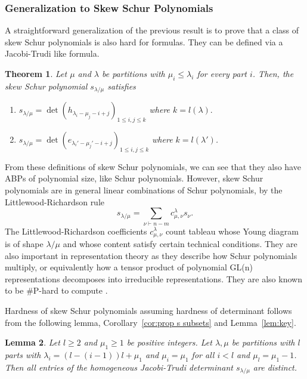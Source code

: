 \documentclass[10pt,a4paper]{article}
\newtheorem{theorem}{Theorem}
\newtheorem{lemma}[theorem]{Lemma}
\theoremstyle{definition}
\begin{document}
%
%
%
%
%

%

 


\subsubsection{Generalization to Skew Schur Polynomials}

A straightforward generalization of the previous result is to prove that a class of skew Schur polynomials is also hard for formulas. They can be defined via a Jacobi-Trudi like formula. 

\begin{theorem}\label{def: skew schur definition}
Let $\mu$ and $\lambda$ be partitions with $\mu_i \leq \lambda_i$ for every part $i$. Then, the skew Schur polynomial $s_{\lambda/\mu}$ satisfies

\begin{enumerate}
\item $s_{\lambda/\mu} = \det(h_{\lambda_i - \mu_j - i + j})_{1\leq i, j \leq k}$ where $k = l(\lambda).$
\item $s_{\lambda/\mu} = \det(e_{\lambda_i' - \mu_j' - i+j})_{1 \leq i, j \leq k}$ where $k = l(\lambda')$.  
\end{enumerate}
\end{theorem}

From these definitions of skew Schur polynomials, we can see that they also have ABPs of polynomial size, like Schur polynomials. However, skew Schur polynomials are in general linear combinations of Schur polynomials, by the Littlewood-Richardson rule $$s_{\lambda / \mu} = \sum_{\nu \vdash n - m} c^\lambda_{\mu, \nu} s_\nu.$$ The Littlewood-Richardson coefficients $c^\lambda_{\mu, \nu}$ count tableau whose Young diagram is of shape $\lambda / \mu$ and whose content satisfy certain technical conditions. They are also important in representation theory as they describe how Schur polynomials multiply, or equivalently how a tensor product of polynomial GL(n) representations decomposes into irreducible representations. They are also known to be \#P-hard to compute \cite{r29}. 

Hardness of skew Schur polynomials assuming hardness of determinant follows from the following lemma, Corollary~\ref{cor:prop s subsets} and Lemma~\ref{lem:key}.
%
%
%

%
%
%
%

%
\begin{lemma}\label{lem: skew distinct}
Let $l \geq 2$ and $\mu_1 \geq 1$ be positive integers. Let $\lambda, \mu$ be partitions with $l$ parts with $\lambda_i = (l-(i-1))l + \mu_1$ and $\mu_i = \mu_1$ for all $i < l$ and $\mu_l = \mu_1 - 1$. Then all entries of the homogeneous Jacobi-Trudi determinant $s_{\lambda/\mu}$ are distinct. 
\end{lemma}
\end{document}
